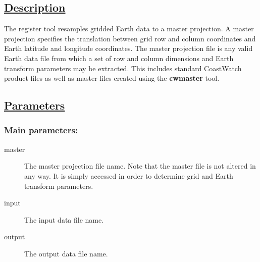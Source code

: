 \subsection*{\underline{Description}}


  The register tool resamples gridded Earth data to a master projection. A master projection specifies the translation between grid row and column coordinates and Earth latitude and longitude coordinates. The master projection file is any valid Earth data file from which a set of row and column dimensions and Earth transform parameters may be extracted. This includes standard CoastWatch product files as well as master files created using the \textbf{cwmaster}
 tool. 
\subsection*{\underline{Parameters}}
\subsubsection*{Main parameters:}
\begin{description}
\item[master]The master projection file name. Note that the master file is not altered in any way. It is simply accessed in order to determine grid and Earth transform parameters.
\item[input]The input data file name.
\item[output]The output data file name.

\end{description}
